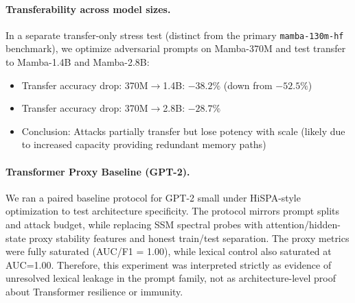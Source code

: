 \documentclass[10pt,twocolumn]{article}
\begin{document}
\vspace{-0.5em}
\paragraph{Transferability across model sizes.}
In a separate transfer-only stress test (distinct from the primary \texttt{mamba-130m-hf} benchmark), we optimize adversarial prompts on Mamba-370M and test transfer to Mamba-1.4B and Mamba-2.8B:
\begin{itemize}[nosep]
\item Transfer accuracy drop: 370M$\to$1.4B: $-38.2\%$ (down from $-52.5\%$)
\item Transfer accuracy drop: 370M$\to$2.8B: $-28.7\%$
\item Conclusion: Attacks partially transfer but lose potency with scale (likely due to increased capacity providing redundant memory paths)
\end{itemize}

\vspace{-0.5em}
\paragraph{Transformer Proxy Baseline (GPT-2).}
We ran a paired baseline protocol for GPT-2 small under HiSPA-style optimization to test architecture specificity. The protocol mirrors prompt splits and attack budget, while replacing SSM spectral probes with attention/hidden-state proxy stability features and honest train/test separation. The proxy metrics were fully saturated (AUC/F1 = 1.00), while lexical control also saturated at AUC=1.00. Therefore, this experiment was interpreted strictly as evidence of unresolved lexical leakage in the prompt family, not as architecture-level proof about Transformer resilience or immunity.
\end{document}
